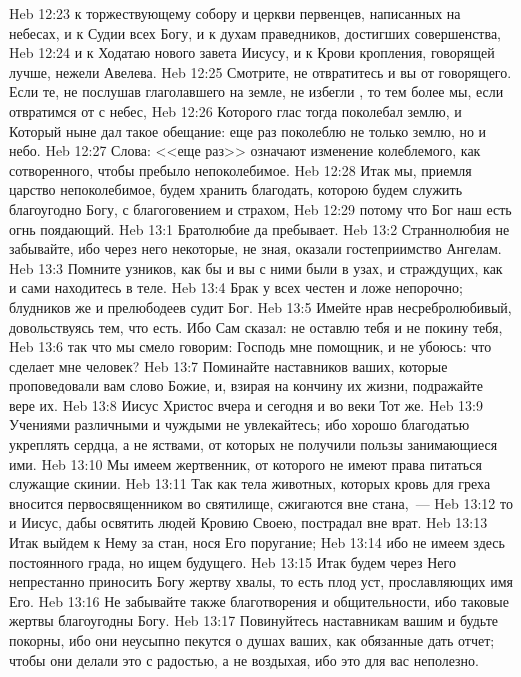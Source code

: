 \vs Heb 12:23 к торжествующему собору и церкви первенцев, написанных на небесах, и к Судии всех Богу, и к духам праведников, достигших совершенства,
\vs Heb 12:24 и к Ходатаю нового завета Иисусу, и к Крови кропления, говорящей лучше, нежели Авелева.
\vs Heb 12:25 Смотрите, не отвратитесь и вы от говорящего. Если те, не послушав глаголавшего на земле, не избегли , то тем более  мы, если отвратимся от  с небес,
\vs Heb 12:26 Которого глас тогда поколебал землю, и Который ныне дал такое обещание: еще раз поколеблю не только землю, но и небо.
\vs Heb 12:27 Слова: <<еще раз>> означают изменение колеблемого, как сотворенного, чтобы пребыло непоколебимое.
\vs Heb 12:28 Итак мы, приемля царство непоколебимое, будем хранить благодать, которою будем служить благоугодно Богу, с благоговением и страхом,
\vs Heb 12:29 потому что Бог наш есть огнь поядающий.
\vs Heb 13:1 Братолюбие  да пребывает.
\vs Heb 13:2 Страннолюбия не забывайте, ибо через него некоторые, не зная, оказали гостеприимство Ангелам.
\vs Heb 13:3 Помните узников, как бы и вы с ними были в узах, и страждущих, как и сами находитесь в теле.
\rsbpar\vs Heb 13:4 Брак у всех  честен и ложе непорочно; блудников же и прелюбодеев судит Бог.
\vs Heb 13:5 Имейте нрав несребролюбивый, довольствуясь тем, что есть. Ибо Сам сказал: не оставлю тебя и не покину тебя,
\vs Heb 13:6 так что мы смело говорим: Господь мне помощник, и не убоюсь: что сделает мне человек?
\rsbpar\vs Heb 13:7 Поминайте наставников ваших, которые проповедовали вам слово Божие, и, взирая на кончину их жизни, подражайте вере их.
\vs Heb 13:8 Иисус Христос вчера и сегодня и во веки Тот же.
\vs Heb 13:9 Учениями различными и чуждыми не увлекайтесь; ибо хорошо благодатью укреплять сердца, а не яствами, от которых не получили пользы занимающиеся ими.
\vs Heb 13:10 Мы имеем жертвенник, от которого не имеют права питаться служащие скинии.
\vs Heb 13:11 Так как тела животных, которых кровь для  греха вносится первосвященником во святилище, сжигаются вне стана,~---
\vs Heb 13:12 то и Иисус, дабы освятить людей Кровию Своею, пострадал вне врат.
\rsbpar\vs Heb 13:13 Итак выйдем к Нему за стан, нося Его поругание;
\vs Heb 13:14 ибо не имеем здесь постоянного града, но ищем будущего.
\vs Heb 13:15 Итак будем через Него непрестанно приносить Богу жертву хвалы, то есть плод уст, прославляющих имя Его.
\vs Heb 13:16 Не забывайте также благотворения и общительности, ибо таковые жертвы благоугодны Богу.
\rsbpar\vs Heb 13:17 Повинуйтесь наставникам вашим и будьте покорны, ибо они неусыпно пекутся о душах ваших, как обязанные дать отчет; чтобы они делали это с радостью, а не воздыхая, ибо это для вас неполезно.
